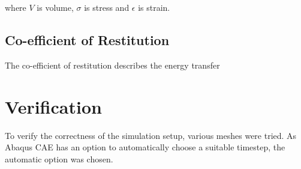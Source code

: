 where $V$ is volume, $\sigma$ is stress and $\epsilon$ is strain.

\subsection{Co-efficient of Restitution}

The co-efficient of restitution describes the energy transfer 	 

\section{Verification}

To verify the correctness of the simulation setup, various meshes were tried. 
As Abaqus CAE has an option to automatically choose a suitable timestep, the automatic option was chosen.